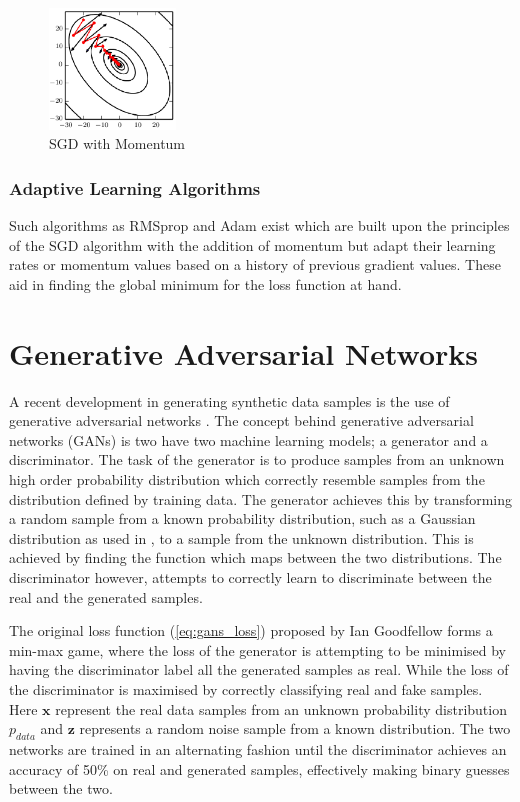 \begin{figure}[h]
    \centering
        \includegraphics[width=0.3\textwidth]{figures/momentum.png}
    \caption{SGD with Momentum \cite{Goodfellow-et-al-2016}}\label{fig:Momentum}
\end{figure}

\subsubsection{Adaptive Learning Algorithms}
Such algorithms as RMSprop and Adam exist which are built upon the principles of the SGD algorithm with the addition of momentum but adapt their learning rates or momentum values based on a history of previous gradient values.
These aid in finding the global minimum for the loss function at hand.

\section{Generative Adversarial Networks}

A recent development in generating synthetic data samples is the use of generative adversarial networks \cite{Goodfellow2014}.
The concept behind generative adversarial networks (GANs) is two have two machine learning models; a generator and a discriminator.
The task of the generator is to produce samples from an unknown high order probability distribution which correctly resemble samples from the distribution defined by training data.
The generator achieves this by transforming a random sample from a known probability distribution, such as a Gaussian distribution as used in \cite{Goodfellow2014}, to a sample from the unknown distribution.
This is achieved by finding the function which maps between the two distributions.
The discriminator however, attempts to correctly learn to discriminate between the real and the generated samples.

The original loss function (\ref{eq:gans_loss}) proposed by Ian Goodfellow forms a min-max game, where the loss of the generator is attempting to be minimised by having the discriminator label all the generated samples as real.
While the loss of the discriminator is maximised by correctly classifying real and fake samples.
Here $\bm{x}$ represent the real data samples from an unknown probability distribution $p_{data}$ and $\bm{z}$ represents a random noise sample from a known distribution.
The two networks are trained in an alternating fashion until the discriminator achieves an accuracy of 50\% on real and generated samples, effectively making binary guesses between the two.

